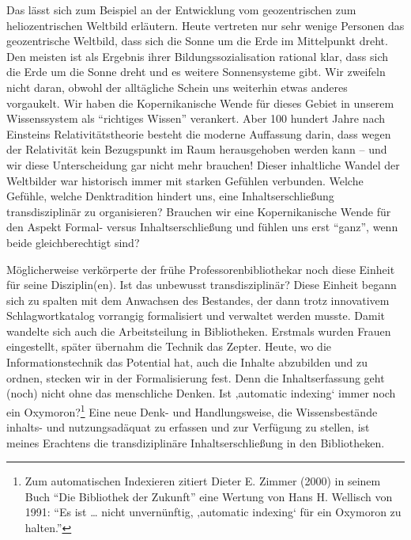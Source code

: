 Das lässt sich zum Beispiel an der Entwicklung vom geozentrischen zum
heliozentrischen Weltbild erläutern. Heute vertreten nur sehr wenige
Personen das geozentrische Weltbild, dass sich die Sonne um die Erde im
Mittelpunkt dreht. Den meisten ist als Ergebnis ihrer
Bildungssozialisation rational klar, dass sich die Erde um die Sonne
dreht und es weitere Sonnensysteme gibt. Wir zweifeln nicht daran,
obwohl der alltägliche Schein uns weiterhin etwas anderes vorgaukelt.
Wir haben die Kopernikanische Wende für dieses Gebiet in unserem
Wissenssystem als \enquote{richtiges Wissen} verankert. Aber 100 hundert
Jahre nach Einsteins Relativitätstheorie besteht die moderne Auffassung
darin, dass wegen der Relativität kein Bezugspunkt im Raum herausgehoben
werden kann -- und wir diese Unterscheidung gar nicht mehr brauchen!
Dieser inhaltliche Wandel der Weltbilder war historisch immer mit
starken Gefühlen verbunden. Welche Gefühle, welche Denktradition hindert
uns, eine Inhaltserschließung transdisziplinär zu organisieren? Brauchen
wir eine Kopernikanische Wende für den Aspekt Formal- versus
Inhaltserschließung und fühlen uns erst \enquote{ganz}, wenn beide
gleichberechtigt sind?

Möglicherweise verkörperte der frühe Professorenbibliothekar noch diese
Einheit für seine Disziplin(en). Ist das unbewusst transdisziplinär?
Diese Einheit begann sich zu spalten mit dem Anwachsen des Bestandes,
der dann trotz innovativem Schlagwortkatalog vorrangig formalisiert und
verwaltet werden musste. Damit wandelte sich auch die Arbeitsteilung in
Bibliotheken. Erstmals wurden Frauen eingestellt, später übernahm die
Technik das Zepter. Heute, wo die Informationstechnik das Potential hat,
auch die Inhalte abzubilden und zu ordnen, stecken wir in der
Formalisierung fest. Denn die Inhaltserfassung geht (noch) nicht ohne
das menschliche Denken. Ist ‚automatic indexing` immer noch ein
Oxymoron?\footnote{Zum automatischen Indexieren zitiert Dieter E. Zimmer
  (2000) in seinem Buch \enquote{Die Bibliothek der Zukunft} eine
  Wertung von Hans H. Wellisch von 1991: \enquote{Es ist \ldots{} nicht
  unvernünftig, ‚automatic indexing` für ein Oxymoron zu halten.}} Eine
neue Denk- und Handlungsweise, die Wissensbestände inhalts- und
nutzungsadäquat zu erfassen und zur Verfügung zu stellen, ist meines
Erachtens die transdiziplinäre Inhaltserschließung in den Bibliotheken.


